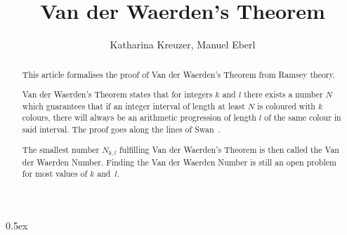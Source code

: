 \documentclass[11pt,a4paper]{article}
\begin{document}
\title{Van der Waerden's Theorem}
\author{Katharina Kreuzer, Manuel Eberl}
\maketitle

\begin{abstract}
This article formalises the proof of Van der Waerden's Theorem from Ramsey theory. 

Van der Waerden's Theorem states that for integers $k$ and $l$ there exists a number $N$ which guarantees that if an integer interval of length at least $N$ is coloured with $k$ colours, there will always be an arithmetic progression of length $l$ of the same colour in said interval. 
The proof goes along the lines of Swan~\cite{Swan}.

The smallest number $N_{k,l}$ fulfilling Van der Waerden's Theorem is then called the Van der Waerden Number. Finding the Van der Waerden Number is still an open problem for most values of $k$ and~$l$.
\end{abstract}


\newpage
\tableofcontents

\newpage
\parindent 0pt\parskip 0.5ex



\nocite{Swan}



\end{document}
